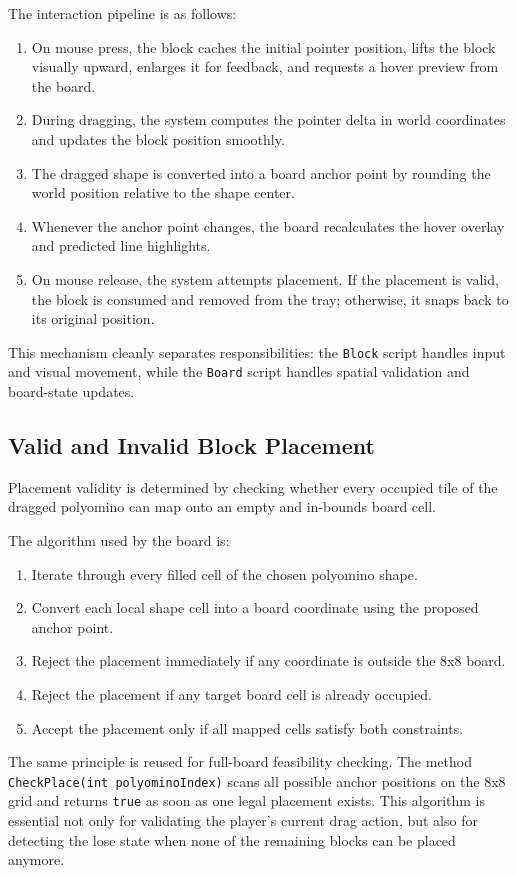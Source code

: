 \documentclass[a4paper,12pt]{report}
\begin{document}
The interaction pipeline is as follows:
\begin{enumerate}
    \item On mouse press, the block caches the initial pointer position, lifts the block visually upward, enlarges it for feedback, and requests a hover preview from the board.
    \item During dragging, the system computes the pointer delta in world coordinates and updates the block position smoothly.
    \item The dragged shape is converted into a board anchor point by rounding the world position relative to the shape center.
    \item Whenever the anchor point changes, the board recalculates the hover overlay and predicted line highlights.
    \item On mouse release, the system attempts placement. If the placement is valid, the block is consumed and removed from the tray; otherwise, it snaps back to its original position.
\end{enumerate}

This mechanism cleanly separates responsibilities: the \texttt{Block} script handles input and visual movement, while the \texttt{Board} script handles spatial validation and board-state updates.

\subsection{Valid and Invalid Block Placement}
Placement validity is determined by checking whether every occupied tile of the dragged polyomino can map onto an empty and in-bounds board cell.

The algorithm used by the board is:
\begin{enumerate}
    \item Iterate through every filled cell of the chosen polyomino shape.
    \item Convert each local shape cell into a board coordinate using the proposed anchor point.
    \item Reject the placement immediately if any coordinate is outside the 8x8 board.
    \item Reject the placement if any target board cell is already occupied.
    \item Accept the placement only if all mapped cells satisfy both constraints.
\end{enumerate}

The same principle is reused for full-board feasibility checking. The method \texttt{CheckPlace(int polyominoIndex)} scans all possible anchor positions on the 8x8 grid and returns \texttt{true} as soon as one legal placement exists. This algorithm is essential not only for validating the player's current drag action, but also for detecting the lose state when none of the remaining blocks can be placed anymore.
\end{document}
